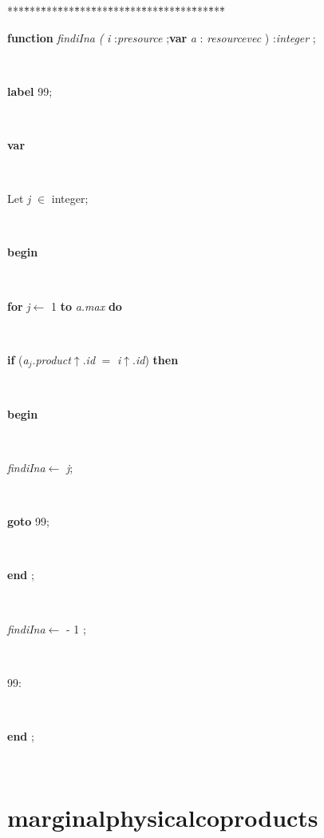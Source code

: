\begin{tabbing}
***\=***\=***\=***\=***\=***\=***\=***\=***\=***\=***\=***\=***\=\kill
\parbox{14cm}{\textsf{\textbf{function}  \textit{findiIna} \textit{(}   \textit{i} :\textit{presource} ;\textbf{var}  \textit{a} : \textit{resourcevec} ) :\textit{integer} ;}}\\
\parbox{14cm}{\textsf{\textbf{label}  99;}}\\
\+\parbox{14cm}{\textsf{\textbf{var} }}\\
\parbox{14cm}{\textsf{Let \textit{j} $\in$ integer;}}\\
\-\<\+\parbox{14cm}{\textsf{\textbf{begin} }}\\
\+\parbox{14cm}{\textsf {\textbf {for } \textsf{\textit{j}$\leftarrow$ 1} \textbf{ to } \textsf{\textit{a.max}} \textbf{ do } }}\\
\+\parbox{14cm}{\textsf {\textbf {if } \textsf{(\textit{a}$_{\textit{j}}$.\textit{product}$\uparrow$.\textit{id} $=$ \textit{i}$\uparrow$.\textit{id})} \textbf{ then } }}\\
\<\parbox{14cm}{\textsf{\textbf{begin} }}\\
\parbox{14cm}{\textsf{\textit{findiIna}$\leftarrow$ \textit{j}}; }\\
\parbox{14cm}{\textsf {\textbf {goto } \textsf{99}; }}\\
\<\-\parbox{14cm}{\textsf{\textbf{end} ;}}\\
\parbox{14cm}{\textsf{\textit{findiIna}$\leftarrow$  -  1 }; }\\
\parbox{14cm}{\textsf{99:}}\\
\<\-\<\-\parbox{14cm}{\textsf{\textbf{end} ;}}\\
\end{tabbing}
\section{marginalphysicalcoproducts}\label{sec:technologiesmarginalphysicalcoproducts}

